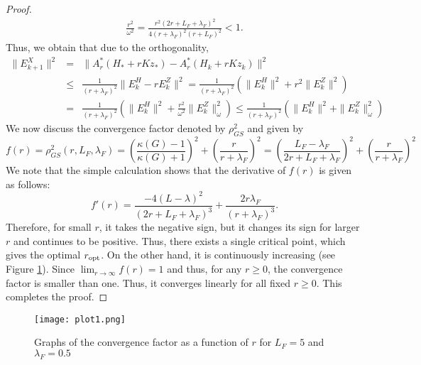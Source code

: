 \begin{itemize}
\begin{proof}
\begin{eqnarray*}
\frac{r^2}{\omega^2} = \frac{r^2 (2r + L_F + \lambda_F)^2}{4(r + \lambda_F)^2(r + L_F)^2} < 1. 
\end{eqnarray*}
Thus, we obtain that due to the orthogonality, 
\begin{eqnarray*}
\|E_{k+1}^X\|^2 &=& \|A_r^*(H_* + rKz_*) - A_r^*(H_k + r K z_k) \|^2 \\
&\leq& \frac{1}{(r + \lambda_F)^2}\|E_k^H - r E_k^Z\|^2 = \frac{1}{(r + \lambda_F)^2} \left ( \|E_k^H\|^2 + r^2 \|E_k^Z\|^2 \right ) \\
&=& \frac{1}{(r + \lambda_F)^2} \left ( \|E_k^H\|^2 + \frac{r^2}{\omega^2} \|E_k^Z\|_\omega ^2 \right ) \leq \frac{1}{(r + \lambda_F)^2} \left ( \|E_k^H\|^2 + \|E_k^Z\|_\omega ^2 \right ) 
\end{eqnarray*}
We now discuss the convergence factor denoted by $\rho_{GS}^2$ and given by 
\begin{equation}
f(r) = \rho^2_{GS}(r, L_F, \lambda_F) = \left ( \frac{\kappa(G) - 1}{\kappa(G) + 1} \right )^2 + \left ( \frac{r}{r+\lambda_F} \right )^2 = \left ( \frac{L_F - \lambda_F}{2r + L_F + \lambda_F} \right )^2 + \left ( \frac{r}{r+\lambda_F} \right )^2 
\end{equation}
We note that the simple calculation shows that the derivative of $f(r)$ is given as follows: 
\begin{equation}
f'(r) = \frac{-4(L-\lambda)^2}{(2r + L_F + \lambda_F)^3} + \frac{2r \lambda_F}{(r + \lambda_F)^3}. 
\end{equation}
Therefore, for small $r$, it takes the negative sign, but it changes its sign for larger $r$ and continues to be positive. Thus, there exists a single critical point, which gives the optimal $r_{\rm opt}$. On the other hand, it is continuously increasing (see Figure \ref{exam}). Since $\lim_{r \rightarrow \infty} f(r) = 1$ and thus, for any $r \geq 0$, the convergence factor is smaller than one. Thus, it converges linearly for all fixed $r \geq 0$. This completes the proof.
\end{proof} 
\begin{figure}[h]
\centering
\texttt{[image: plot1.png]}
\caption{Graphs of the convergence factor as a function of $r$ for $L_F = 5$ and $\lambda_F = 0.5$}\label{exam} 
\end{figure}
\begin{comment} 


\end{comment}
\end{itemize}
